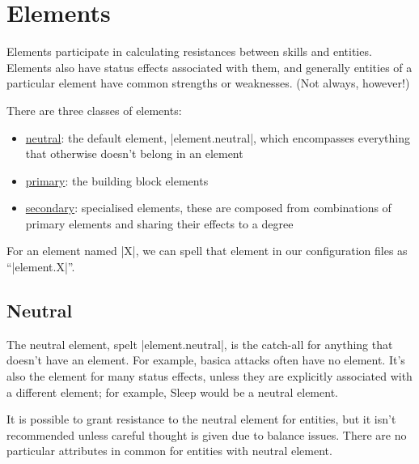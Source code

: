 \chapter{Elements}
\label{ch:elements}

Elements participate in calculating resistances between skills and entities.
Elements also have status effects associated with them,
and generally entities of a particular element have common strengths or weaknesses.
(Not always, however!)


There are three classes of elements:
\begin{itemize}
    \item \hyperref[sec:element_neutral]{neutral}: the default element, |element.neutral|,
        which encompasses everything that otherwise doesn't belong in an element
    \item \hyperref[sec:element_primary]{primary}: the building block elements
    \item \hyperref[sec:element_secondary]{secondary}: specialised elements,
        these are composed from combinations of primary elements
        and sharing their effects to a degree
\end{itemize}

For an element named |X|,
we can spell that element in our configuration files as ``|element.X|''.

\section{Neutral}
\label{sec:element_neutral}

The neutral element, spelt |element.neutral|,
is the catch-all for anything that doesn't have an element.
For example, basica attacks often have no element.
It's also the element for many status effects,
unless they are explicitly associated with a different element;
for example, Sleep would be a neutral element.

It is possible to grant resistance to the neutral element for entities,
but it isn't recommended unless careful thought is given due to balance issues.
There are no particular attributes in common for entities with neutral element.

